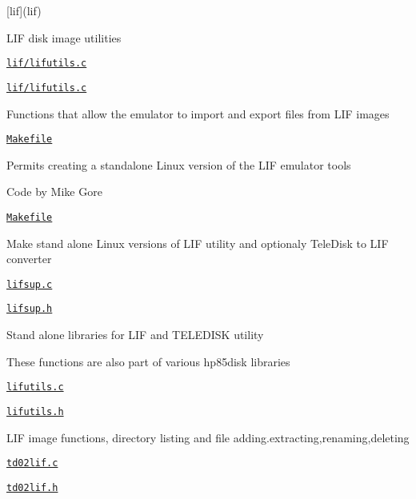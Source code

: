 \begin{DoxyItemize}
\item \mbox{[}lif\mbox{]}(lif)
\begin{DoxyItemize}
\item L\+IF disk image utilities
\item \href{lif/lifutils.c}{\tt lif/lifutils.\+c}
\item \href{lif/lifutils.c}{\tt lif/lifutils.\+c}
\begin{DoxyItemize}
\item Functions that allow the emulator to import and export files from L\+IF images
\end{DoxyItemize}
\item \href{lif/Makefile}{\tt Makefile}
\begin{DoxyItemize}
\item Permits creating a standalone Linux version of the L\+IF emulator tools
\end{DoxyItemize}
\item Code by Mike Gore
\begin{DoxyItemize}
\item \href{lif/Makefile}{\tt Makefile}
\begin{DoxyItemize}
\item Make stand alone Linux versions of L\+IF utility and optionaly Tele\+Disk to L\+IF converter
\end{DoxyItemize}
\item \href{lif/lifsup.c}{\tt lifsup.\+c}
\item \href{lif/lifsup.h}{\tt lifsup.\+h}
\begin{DoxyItemize}
\item Stand alone libraries for L\+IF and T\+E\+L\+E\+D\+I\+SK utility
\begin{DoxyItemize}
\item These functions are also part of various hp85disk libraries
\end{DoxyItemize}
\end{DoxyItemize}
\item \href{lif/lifutils.c}{\tt lifutils.\+c}
\item \href{lif/lifutils.h}{\tt lifutils.\+h}
\begin{DoxyItemize}
\item L\+IF image functions, directory listing and file adding.\+extracting,renaming,deleting
\end{DoxyItemize}
\item \href{lif/td02lif.c}{\tt td02lif.\+c}
\item \href{lif/td02lif.h}{\tt td02lif.\+h}

\end{DoxyItemize}
\end{DoxyItemize}
\end{DoxyItemize}
